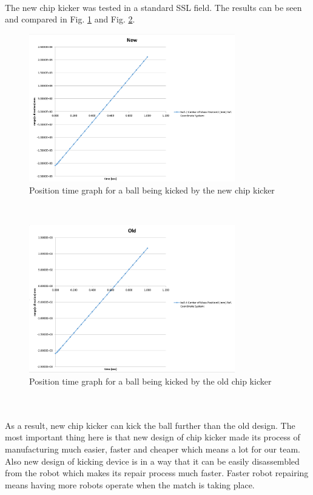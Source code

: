 \\
The new chip kicker was tested in a standard SSL field. The results can be seen and compared in Fig. \ref{fig:NEWPLOTBALL} and Fig. \ref{fig:OLDPLOTBALL}.\\
\begin{figure}
	\centering
	\includegraphics[width=0.8\textwidth]{images/NewBallPlot.png}
	\caption{Position time graph for a ball being kicked by the new chip kicker}
	\label{fig:NEWPLOTBALL}
\end{figure}\\
\begin{figure}
	\centering
	\includegraphics[width=0.8\textwidth]{images/OldBallPlot.png}
	\caption{Position time graph for a ball being kicked by the old chip kicker}
	\label{fig:OLDPLOTBALL}
\end{figure}\\
\\
As a result, new chip kicker can kick the ball further than the old design. The most important thing here is that new design of chip kicker made its process of manufacturing much easier, faster and cheaper which means a lot for our team. Also new design of kicking device is in a way that it can be easily disassembled from the robot which makes its repair process much faster. Faster robot repairing means having more robots operate when the match is taking place.



